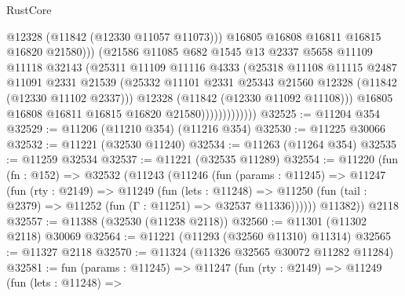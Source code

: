 \begin{lexlean}{RustCore}
\begin{coremodule}
                                  @12328
                                  (@11842 (@12330 @11057 @11073)))
                                @16805
                                @16808
                                @16811
                                @16815
                                @16820
                                @21580)))
                          (@21586
                            @11085
                            @682
                            @1545
                            @13
                            @2337
                            @5658
                            @11109
                            @11118
                            @32143
                            (@25311
                              @11109
                              @11116
                              @4333
                              (@25318
                                @11108
                                @11115
                                @2487
                                @11091
                                @2331
                                @21539
                                (@25332
                                  @11101
                                  @2331
                                  @25343
                                  @21560
                                  @12328
                                  (@11842 (@12330 @11102 @2337)))
                                @12328
                                (@11842 (@12330 @11092 @11108)))
                              @16805
                              @16808
                              @16811
                              @16815
                              @16820
                              @21580)))))))))))))
@32525 := @11204 @354
@32529 := @11206 (@11210 @354) (@11216 @354)
@32530 := @11225 @30066
@32532 := @11221 (@32530 @11240)
@32534 := @11263 (@11264 @354)
@32535 := @11259 @32534
@32537 := @11221 (@32535 @11289)
@32554 := @11220
    (fun (fn : @152) =>
    @32532
      (@11243
        (@11246
          (fun (params : @11245) =>
          @11247
            (fun (rty : @2149) =>
            @11249
              (fun (lets : @11248) =>
              @11250 (fun (tail : @2379) => @11252 (fun (Γ : @11251) => @32537 @11336))))))
        @11382))
    @2118
@32557 := @11388 (@32530 (@11238 @2118))
@32560 := @11301 (@11302 @2118) @30069
@32564 := @11221 (@11293 (@32560 @11310) @11314)
@32565 := @11327 @2118
@32570 := @11324 (@11326 @32565 @30072 @11282 @11284)
@32581 := fun (params : @11245) =>
  @11247
    (fun (rty : @2149) =>
    @11249
      (fun (lets : @11248) =>

\end{coremodule}
\end{lexlean}
